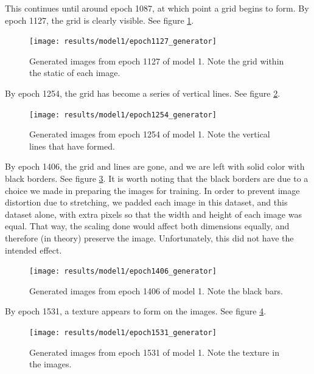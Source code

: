 \documentclass[11pt,letterpaper]{article}
\begin{document}
				This continues until around epoch 1087, at which point a grid begins to form.
				By epoch 1127, the grid is clearly visible.
				See figure \ref{fig:vgm:epoch1127generator}.
				\begin{figure}
					\centering
					\texttt{[image: results/model1/epoch1127\_generator]}
					\caption[Van Gogh Museum dataset, epoch 1127]{Generated images from epoch 1127 of model 1. Note the grid within the static of each image.}
					\label{fig:vgm:epoch1127generator}
				\end{figure}

				By epoch 1254, the grid has become a series of vertical lines.
				See figure \ref{fig:vgm:epoch1254generator}.
				\begin{figure}
					\centering
					\texttt{[image: results/model1/epoch1254\_generator]}
					\caption[Van Gogh Museum dataset, epoch 1254]{Generated images from epoch 1254 of model 1. Note the vertical lines that have formed.}
					\label{fig:vgm:epoch1254generator}
				\end{figure}

				By epoch 1406, the grid and lines are gone, and we are left with solid color with black borders.
				See figure \ref{fig:vgm:epoch1406generator}.
				It is worth noting that the black borders are due to a choice we made in preparing the images for training.
				In order to prevent image distortion due to stretching, we padded each image in this dataset, and this dataset alone, with extra pixels so that the width and height of each image was equal.
				That way, the scaling done would affect both dimensions equally, and therefore (in theory) preserve the image.
				Unfortunately, this did not have the intended effect.
				\begin{figure}
					\centering
					\texttt{[image: results/model1/epoch1406\_generator]}
					\caption[Van Gogh Museum dataset, epoch 1406]{Generated images from epoch 1406 of model 1. Note the black bars.}
					\label{fig:vgm:epoch1406generator}
				\end{figure}

				By epoch 1531, a texture appears to form on the images.
				See figure \ref{fig:vgm:epoch1531generator}.
				\begin{figure}
					\centering
					\texttt{[image: results/model1/epoch1531\_generator]}
					\caption[Van Gogh Museum dataset, epoch 1531]{Generated images from epoch 1531 of model 1. Note the texture in the images.}
					\label{fig:vgm:epoch1531generator}
				\end{figure}
\end{document}
